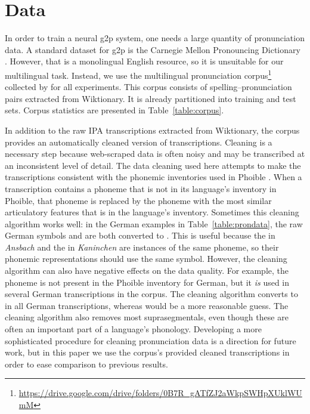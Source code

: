 \documentclass[11pt,letterpaper]{article}
\begin{document}
\section{Data}
In order to train a neural g2p system, one needs a large quantity of pronunciation data. A standard dataset for g2p is the Carnegie Mellon Pronouncing Dictionary \cite{lenzo2007cmu}. However, that is a monolingual English resource, so it is unsuitable for our multilingual task. Instead, we use the multilingual pronunciation corpus\footnote{\url{https://drive.google.com/drive/folders/0B7R_gATfZJ2aWkpSWHpXUklWUmM}} collected by  for all experiments. This corpus consists of spelling--pronunciation pairs extracted from Wiktionary. It is already partitioned into training and test sets. 
Corpus statistics are presented in Table~\ref{table:corpus}.

In addition to the raw IPA transcriptions extracted from Wiktionary, the corpus provides an automatically cleaned version of transcriptions. Cleaning is a necessary step because web-scraped data is often noisy and may be transcribed at an inconsistent level of detail. The data cleaning used here attempts to make the transcriptions consistent with the phonemic inventories used in Phoible \cite{phoible}. When a transcription contains a phoneme that is not in its language's inventory in Phoible, that phoneme is replaced by the phoneme with the most similar articulatory features that is in the language's inventory. Sometimes this cleaning algorithm works well: in the German examples in Table~\ref{table:prondata}, the raw German symbols  and  are both converted to . This is useful because the  in \textit{Ansbach} and the  in \textit{Kaninchen} are instances of the same phoneme, so their phonemic representations should use the same symbol. However, the cleaning algorithm can also have negative effects on the data quality. For example, the phoneme  is not present in the Phoible inventory for German, but it \emph{is} used in several German transcriptions in the corpus. The cleaning algorithm converts  to  in all German transcriptions, whereas  would be a more reasonable guess. The cleaning algorithm also removes most suprasegmentals, even though these are often an important part of a language's phonology. Developing a more sophisticated procedure for cleaning pronunciation data is a direction for future work, but in this paper we use the corpus's provided cleaned transcriptions in order to ease comparison to previous results.
\end{document}
